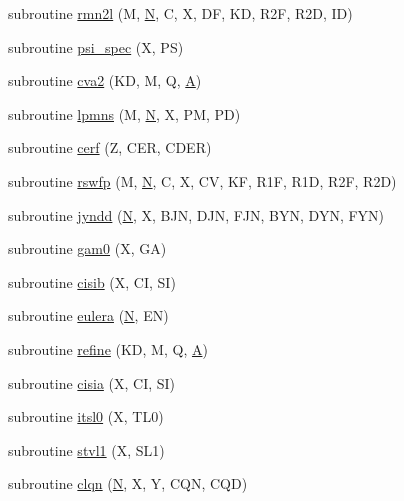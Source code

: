 \begin{DoxyCompactItemize}
\item 
subroutine \hyperlink{specfun_8f_af7f38c8529facd2840b0cecb10e6b582}{rmn2l} (M, \hyperlink{polmisc_8c_a0240ac851181b84ac374872dc5434ee4}{N}, C, X, D\+F, K\+D, R2\+F, R2\+D, I\+D)
\item 
subroutine \hyperlink{specfun_8f_a4f4563019b886447bccf2368b7dda010}{psi\+\_\+spec} (X, P\+S)
\item 
subroutine \hyperlink{specfun_8f_aac2c8ad499cb3626f91b6decff2baefa}{cva2} (K\+D, M, Q, \hyperlink{classA}{A})
\item 
subroutine \hyperlink{specfun_8f_ac28ec55edf7046070144be26781aad72}{lpmns} (M, \hyperlink{polmisc_8c_a0240ac851181b84ac374872dc5434ee4}{N}, X, P\+M, P\+D)
\item 
subroutine \hyperlink{specfun_8f_a4ec2ab6ff58b9271352ef8995d9db3f1}{cerf} (Z, C\+E\+R, C\+D\+E\+R)
\item 
subroutine \hyperlink{specfun_8f_a5746e553e4227a1451215404157b6168}{rswfp} (M, \hyperlink{polmisc_8c_a0240ac851181b84ac374872dc5434ee4}{N}, C, X, C\+V, K\+F, R1\+F, R1\+D, R2\+F, R2\+D)
\item 
subroutine \hyperlink{specfun_8f_aa5bb323e683c9bb48568713ecf0018e2}{jyndd} (\hyperlink{polmisc_8c_a0240ac851181b84ac374872dc5434ee4}{N}, X, B\+J\+N, D\+J\+N, F\+J\+N, B\+Y\+N, D\+Y\+N, F\+Y\+N)
\item 
subroutine \hyperlink{specfun_8f_ad951a738353da417ea6e343985063636}{gam0} (X, G\+A)
\item 
subroutine \hyperlink{specfun_8f_a2aa0455ee1c333871e254d42cb68eed0}{cisib} (X, C\+I, S\+I)
\item 
subroutine \hyperlink{specfun_8f_a83939b04079d37dbace28ff199219f0f}{eulera} (\hyperlink{polmisc_8c_a0240ac851181b84ac374872dc5434ee4}{N}, E\+N)
\item 
subroutine \hyperlink{specfun_8f_a438b17467d57fb53596043421ccfc992}{refine} (K\+D, M, Q, \hyperlink{classA}{A})
\item 
subroutine \hyperlink{specfun_8f_aa4a6c6311c28b1092ecba1d513b7d90e}{cisia} (X, C\+I, S\+I)
\item 
subroutine \hyperlink{specfun_8f_a393962e8bbfb4565832809422dc8f388}{itsl0} (X, T\+L0)
\item 
subroutine \hyperlink{specfun_8f_a815383af603b20cec4eef0f1a7184600}{stvl1} (X, S\+L1)
\item 
subroutine \hyperlink{specfun_8f_aa7992db898ad4ac26e30715f9152db46}{clqn} (\hyperlink{polmisc_8c_a0240ac851181b84ac374872dc5434ee4}{N}, X, Y, C\+Q\+N, C\+Q\+D)
\item 

\end{DoxyCompactItemize}
